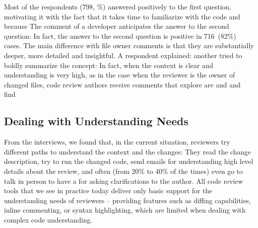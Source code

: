 Most of the respondents (798, \%) answered positively to the first question, motivating it with the fact that it takes time to familiarize with the code and  because  The comment of a developer anticipates the answer to the second question:  In fact, the answer to the second question is positive in 716~(82\%) cases. The main difference with file owner comments is that they are substantially deeper, more detailed and insightful. A respondent explained:  another tried to boldly summarize the concept: 
In fact, when the context is clear and understanding is very high, as in the case when the reviewer is the owner of changed files, code review authors receive comments that explore  are  and  and find 


\subsection{Dealing with Understanding Needs}

From the interviews, we found that, in the current situation, reviewers try different paths to understand the context and the changes: They read the change description, try to run the changed code, send emails for understanding high level details about the review, and often (from 20\% to 40\% of the times) even go to talk in person to have a  for asking clarifications to the author. All code review tools that we see in practice today deliver only basic support for the understanding needs of reviewers -- providing features such as diffing capabilities, inline commenting, or syntax highlighting, which are limited when dealing with complex code understanding.
